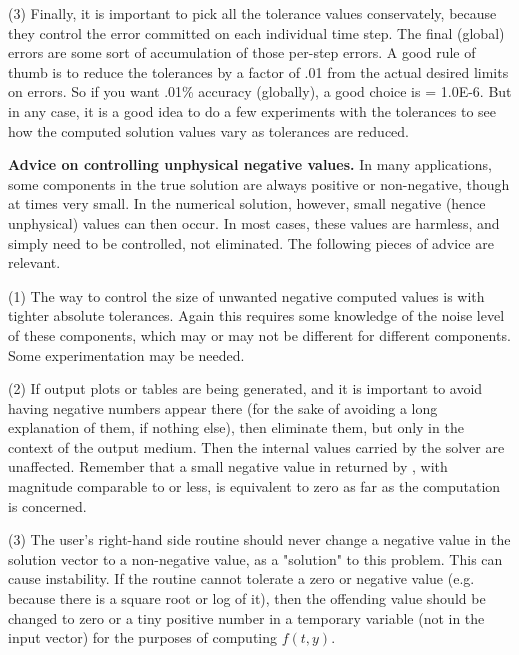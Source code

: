 (3) Finally, it is important to pick all the tolerance values conservately,
because they control the error committed on each individual time step.
The final (global) errors are some sort of accumulation of those
per-step errors.  A good rule of thumb is to reduce the tolerances by a
factor of .01 from the actual desired limits on errors.  So if you
want .01\% accuracy (globally), a good choice is  = 1.0E-6.
But in any case, it is a good idea to do a few experiments with
the tolerances to see how the computed solution values vary as
tolerances are reduced.

\vspace{0.1in}
{\bf Advice on controlling unphysical negative values.}
In many applications, some components in the true solution are always
positive or non-negative, though at times very small.  In the numerical
solution, however, small negative (hence unphysical) values can then
occur.  In most cases, these values are harmless, and simply need to
be controlled, not eliminated. The following pieces of advice are relevant.

(1) The way to control the size of unwanted negative computed values
is with tighter absolute tolerances.  Again this requires some
knowledge of the noise level of these components, which may or may not
be different for different components.  Some experimentation may be
needed.

(2) If output plots or tables are being generated, and it is important
to avoid having negative numbers appear there (for the sake of avoiding
a long explanation of them, if nothing else), then eliminate them, but
only in the context of the output medium.  Then the internal values carried
by the solver are unaffected.  Remember that a small negative value in 
returned by {\cvode}, with magnitude comparable to  or less,
is equivalent to zero as far as the computation is concerned.

(3) The user's right-hand side routine  should never change a
negative value in the solution vector  to a non-negative value,
as a "solution" to this problem.  This can cause instability.  If the
 routine cannot tolerate a zero or negative value (e.g. because
there is a square root or log of it), then the offending value should
be changed to zero or a tiny positive number in a temporary variable
(not in the input  vector) for the purposes of computing $f(t,y)$.


